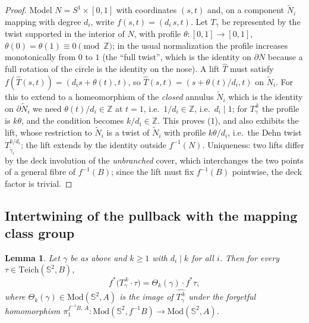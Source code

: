 \documentclass[11pt]{amsart}
\theoremstyle{plain}
\newtheorem{lemma}[theorem]{Lemma}
\theoremstyle{definition}
\newcommand{\Sph}{\mathbb{S}^2}
\newcommand{\Z}{\mathbb{Z}}
\newcommand{\Teich}{\mathrm{Teich}}
\newcommand{\Mod}{\mathrm{Mod}}
\begin{document}
\begin{proof}
Model $N=S^1\times[0,1]$ with coordinates $(s,t)$ and, on a component
$\tilde N_i$ mapping with degree $d_i$, write
$f(s,t)=(d_i\,s,t)$.  Let $T_\gamma$ be represented by the twist supported
in the interior of $N$, with profile $\theta:[0,1]\to[0,1]$,
$\theta(0)=\theta(1)\equiv0\pmod{\Z}$; in the usual normalization the
profile increases monotonically from $0$ to $1$ (the ``full twist'',
which is the identity on $\partial N$ because a full rotation of the
circle is the identity on the nose).  A lift $\widehat{T}$ must satisfy
$f(\widehat{T}(s,t))=(d_is+\theta(t),t)$, so
$\widehat T(s,t)=(s+\theta(t)/d_i,t)$ on $\tilde N_i$.  For this to extend
to a homeomorphism of the \emph{closed} annulus $\tilde N_i$ which is the
identity on $\partial\tilde N_i$ we need $\theta(t)/d_i\in\Z$ at $t=1$,
i.e.\ $1/d_i\in\Z$, i.e.\ $d_i\mid1$; for $T_\gamma^{\,k}$ the profile is
$k\theta$, and the condition becomes $k/d_i\in\Z$.  This proves (1), and
also exhibits the lift, whose restriction to $\tilde N_i$ is a twist of
$\tilde N_i$ with profile $k\theta/d_i$, i.e.\ the Dehn twist
$T_{\tilde\gamma_i}^{k/d_i}$; the lift extends by the identity outside
$f^{-1}(N)$.  Uniqueness: two lifts differ by the deck involution of the
\emph{unbranched} cover, which interchanges the two points of a general
fibre of $f^{-1}(B)$; since the lift must fix $f^{-1}(B)$ pointwise, the
deck factor is trivial.
\end{proof}

\subsection{Intertwining of the pullback with the mapping class group}

\begin{lemma}\label{lem:intertwine2}
Let $\gamma$ be as above and $k\ge1$ with $d_i\mid k$ for all $i$.  Then
for every $\tau\in\Teich(\Sph,B)$,
\begin{equation}\label{eq:intertwine2}
f^{*}\bigl(T_\gamma^{\,k}\cdot\tau\bigr)
=\Theta_k(\gamma)\cdot f^{*}\tau,
\end{equation}
where $\Theta_k(\gamma)\in\Mod(\Sph,A)$ is the image of
$\widehat{T_\gamma^{\,k}}$ under the forgetful homomorphism
$\pi_1^{f^{-1}B,\,A}:\Mod(\Sph,f^{-1}B)\to\Mod(\Sph,A)$.
\end{lemma}
\end{document}
